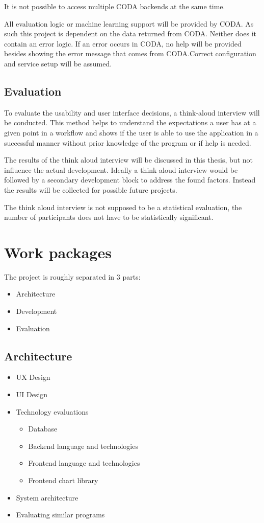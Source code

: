 \documentclass[12pt,a4paper,titlepage,oneside,BCOR1cm]{scrreprt}
\begin{document}
It is not possible to access multiple CODA backends at the same time. 

All evaluation logic or machine learning support will be provided by CODA. As such this project is dependent on the data returned from CODA. Neither does it contain an error logic. If an error occurs in CODA, no help will be provided besides showing the error message that comes from CODA.Correct configuration and service setup will be assumed. 

\section{Evaluation}

To evaluate the usability and user interface decisions, a think-aloud interview will be conducted. This method helps to understand the expectations a user has at a given point in a workflow and shows if the user is able to use the application in a successful manner without prior knowledge of the program or if help is needed.

The results of the think aloud interview will be discussed in this thesis, but not influence the actual development. Ideally a think aloud interview would be followed by a secondary development block to address the found factors. Instead the results will be collected for possible future projects.

The think aloud interview is not supposed to be a statistical evaluation, the number of participants does not have to be statistically significant. 

\chapter{Work packages}

The project is roughly separated in 3 parts:
\begin{itemize}
  \item Architecture
  \item Development
  \item Evaluation
\end{itemize}


\section{Architecture}
\begin{itemize}
  \item UX Design
  \item UI Design
  \item Technology evaluations
  
  \begin{itemize}
    \item Database
    \item Backend language and technologies
    \item Frontend language and technologies
    \item Frontend chart library
  \end{itemize}  
  \item System architecture
  \item Evaluating similar programs

\end{itemize}  
\end{document}

